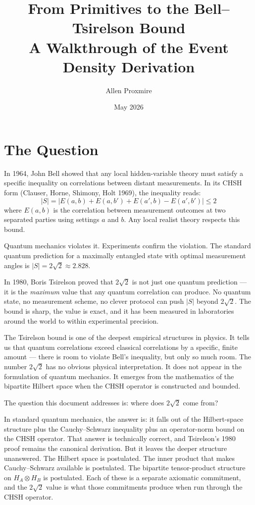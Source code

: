 \documentclass[11pt,a4paper]{article}
\title{\vspace{-1cm}\Large\bfseries From Primitives to the Bell--Tsirelson Bound\\[6pt]
\large\mdseries A Walkthrough of the Event Density Derivation}
\author{Allen Proxmire}
\date{May 2026}
\begin{document}
\maketitle
\thispagestyle{empty}

\section{The Question}

In 1964, John Bell showed that any local hidden-variable theory must satisfy a specific inequality on correlations between distant measurements. In its CHSH form (Clauser, Horne, Shimony, Holt 1969), the inequality reads:
\[
|S| = |E(a, b) + E(a, b') + E(a', b) - E(a', b')| \leq 2
\]
where $E(a, b)$ is the correlation between measurement outcomes at two separated parties using settings $a$ and $b$. Any local realist theory respects this bound.

Quantum mechanics violates it. Experiments confirm the violation. The standard quantum prediction for a maximally entangled state with optimal measurement angles is $|S| = 2\sqrt{2} \approx 2.828$.

In 1980, Boris Tsirelson proved that $2\sqrt{2}$ is not just one quantum prediction --- it is the \emph{maximum} value that any quantum correlation can produce. No quantum state, no measurement scheme, no clever protocol can push $|S|$ beyond $2\sqrt{2}$. The bound is sharp, the value is exact, and it has been measured in laboratories around the world to within experimental precision.

The Tsirelson bound is one of the deepest empirical structures in physics. It tells us that quantum correlations exceed classical correlations by a specific, finite amount --- there is room to violate Bell's inequality, but only so much room. The number $2\sqrt{2}$ has no obvious physical interpretation. It does not appear in the formulation of quantum mechanics. It emerges from the mathematics of the bipartite Hilbert space when the CHSH operator is constructed and bounded.

The question this document addresses is: where does $2\sqrt{2}$ come from?

In standard quantum mechanics, the answer is: it falls out of the Hilbert-space structure plus the Cauchy--Schwarz inequality plus an operator-norm bound on the CHSH operator. That answer is technically correct, and Tsirelson's 1980 proof remains the canonical derivation. But it leaves the deeper structure unanswered. The Hilbert space is postulated. The inner product that makes Cauchy--Schwarz available is postulated. The bipartite tensor-product structure on $H_A \otimes H_B$ is postulated. Each of these is a separate axiomatic commitment, and the $2\sqrt{2}$ value is what those commitments produce when run through the CHSH operator.
\end{document}
